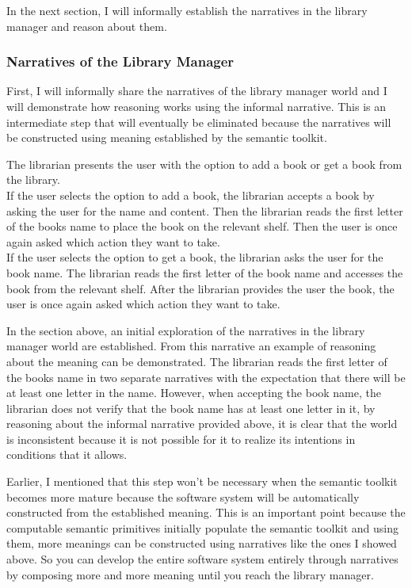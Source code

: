 In the next section, I will informally establish the narratives in the library manager and reason about them. 

\subsubsection{Narratives of the Library Manager}

First, I will informally share the narratives of the library manager world and I will demonstrate how reasoning works using the informal narrative. This is an intermediate step that will eventually be eliminated because the narratives will be constructed using meaning established by the semantic toolkit.

\begin{greyquote}
The librarian presents the user with the option to add a book or get a book from the library.\\

If the user selects the option to add a book, the librarian accepts a book by asking the user for the name and content. Then the librarian reads the first letter of the books name to place the book on the relevant shelf. Then the user is once again asked which action they want to take.\\

If the user selects the option to get a book, the librarian asks the user for the book name. The librarian reads the first letter of the book name and accesses the book from the relevant shelf. After the librarian provides the user the book, the user is once again asked which action they want to take.
\end{greyquote}

In the section above, an initial exploration of the narratives in the library manager world are established. From this narrative an example of reasoning about the meaning can be demonstrated. The librarian reads the first letter of the books name in two separate narratives with the expectation that there will be at least one letter in the name. However, when accepting the book name, the librarian does not verify that the book name has at least one letter in it, by reasoning about the informal narrative provided above, it is clear that the world is inconsistent because it is not possible for it to realize its intentions in conditions that it allows.

Earlier, I mentioned that this step won't be necessary when the semantic toolkit becomes more mature because the software system will be automatically constructed from the established meaning. This is an important point because the computable semantic primitives initially populate the semantic toolkit and using them, more meanings can be constructed using narratives like the ones I showed above. So you can develop the entire software system entirely through narratives by composing more and more meaning until you reach the library manager.

